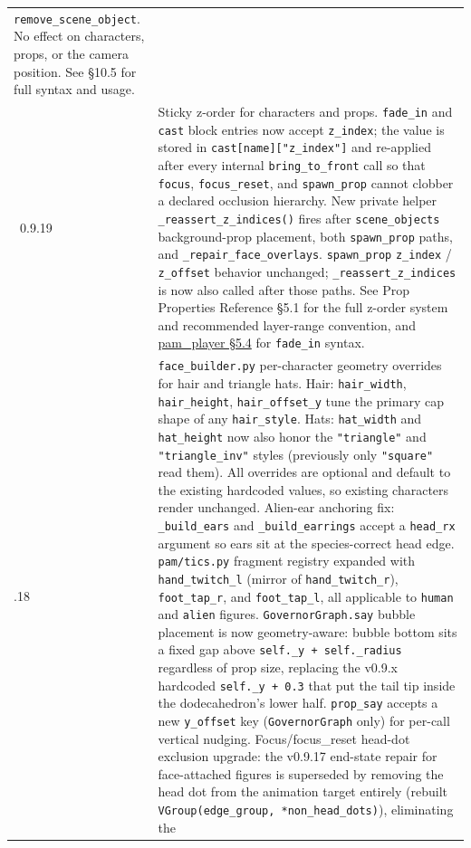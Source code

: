\documentclass[
  12pt,
  letterpaper,
]{book}
\begin{document}
\begin{longtable}[]{@{}
  >{\raggedright\arraybackslash}p{}
  >{\raggedright\arraybackslash}p{}@{}}
\texttt{remove\_scene\_object}. No effect on characters, props, or the
camera position. See §10.5 for full syntax and usage. \\\
0.9.19 & Sticky z-order for characters and props.
\texttt{fade\_in} and \texttt{cast} block entries now accept
\texttt{z\_index}; the value is stored in \texttt{cast[name]["z\_index"]}
and re-applied after every internal \texttt{bring\_to\_front} call so
that \texttt{focus}, \texttt{focus\_reset}, and \texttt{spawn\_prop}
cannot clobber a declared occlusion hierarchy.
New private helper \texttt{\_reassert\_z\_indices()} fires after
\texttt{scene\_objects} background-prop placement, both
\texttt{spawn\_prop} paths, and \texttt{\_repair\_face\_overlays}.
\texttt{spawn\_prop} \texttt{z\_index} / \texttt{z\_offset} behavior
unchanged; \texttt{\_reassert\_z\_indices} is now also called after those
paths. See Prop Properties Reference §5.1 for the full z-order system
and recommended layer-range convention, and
\hyperref[fade-in-z-index]{pam\_player §5.4} for
\texttt{fade\_in} syntax. \\
0.9.18 & \texttt{face\_builder.py} per-character geometry overrides for
hair and triangle hats. Hair: \texttt{hair\_width}, \texttt{hair\_height},
\texttt{hair\_offset\_y} tune the primary cap shape of any
\texttt{hair\_style}. Hats: \texttt{hat\_width} and \texttt{hat\_height}
now also honor the \texttt{"triangle"} and \texttt{"triangle\_inv"}
styles (previously only \texttt{"square"} read them). All overrides are
optional and default to the existing hardcoded values, so existing
characters render unchanged. Alien-ear anchoring fix: \texttt{\_build\_ears}
and \texttt{\_build\_earrings} accept a \texttt{head\_rx} argument so
ears sit at the species-correct head edge. \texttt{pam/tics.py}
fragment registry expanded with \texttt{hand\_twitch\_l} (mirror of
\texttt{hand\_twitch\_r}), \texttt{foot\_tap\_r}, and
\texttt{foot\_tap\_l}, all applicable to \texttt{human} and
\texttt{alien} figures.
\texttt{GovernorGraph.say} bubble placement is now geometry-aware:
bubble bottom sits a fixed gap above
\texttt{self.\_y\ +\ self.\_radius} regardless of prop size, replacing
the v0.9.x hardcoded \texttt{self.\_y\ +\ 0.3} that put the tail tip
inside the dodecahedron's lower half. \texttt{prop\_say} accepts a new
\texttt{y\_offset} key (\texttt{GovernorGraph} only) for per-call
vertical nudging.
Focus/focus\_reset head-dot exclusion upgrade: the v0.9.17 end-state
repair for face-attached figures is superseded by removing the head
dot from the animation target entirely (rebuilt
\texttt{VGroup(edge\_group,\ *non\_head\_dots)}), eliminating the

\end{longtable}
\end{document}
